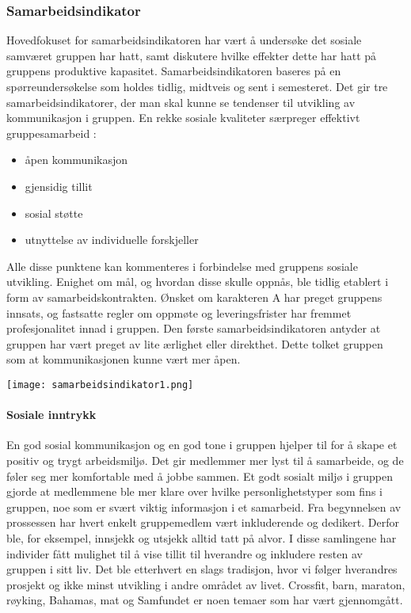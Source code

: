 \subsubsection{Samarbeidsindikator}

Hovedfokuset for samarbeidsindikatoren har vært å undersøke det sosiale samværet gruppen har hatt, samt diskutere hvilke effekter dette har hatt på gruppens produktive kapasitet.
Samarbeidsindikatoren baseres på en spørreundersøkelse som holdes tidlig, midtveis og sent i semesteret.
Det gir tre samarbeidsindikatorer, der man skal kunne se tendenser til utvikling av kommunikasjon i gruppen.
En rekke sosiale kvaliteter særpreger effektivt gruppesamarbeid \cite{orgorg}:

\begin{itemize}
	\item åpen kommunikasjon
	\item gjensidig tillit
	\item sosial støtte
	\item utnyttelse av individuelle forskjeller
\end{itemize}
	
Alle disse punktene kan kommenteres i forbindelse med gruppens sosiale utvikling.
Enighet om mål, og hvordan disse skulle oppnås, ble tidlig etablert i form av samarbeidskontrakten.
Ønsket om karakteren A har preget gruppens innsats, og fastsatte regler om oppmøte og leveringsfrister har fremmet profesjonalitet innad i gruppen.
Den første samarbeidsindikatoren antyder at gruppen har vært preget av lite ærlighet eller direkthet.
Dette tolket gruppen som at kommunikasjonen kunne vært mer åpen.

\begin{center}
	\texttt{[image: samarbeidsindikator1.png]}
\end{center}

\paragraph{Sosiale inntrykk}

En god sosial kommunikasjon og en god tone i gruppen hjelper til for å skape et positiv og trygt arbeidsmiljø.
Det gir medlemmer mer lyst til å samarbeide, og de føler seg mer komfortable med å jobbe sammen.
Et godt sosialt miljø i gruppen gjorde at medlemmene ble mer klare over hvilke personlighetstyper som fins i gruppen, noe som er svært viktig informasjon i et samarbeid.
Fra begynnelsen av prossessen har hvert enkelt gruppemedlem vært inkluderende og dedikert. 
Derfor ble, for eksempel, innsjekk og utsjekk alltid tatt på alvor.
I disse samlingene har individer fått mulighet til å vise tillit til hverandre og inkludere resten av gruppen i sitt liv. 
Det ble etterhvert en slags tradisjon, hvor vi følger hverandres prosjekt og ikke minst utvikling i andre området av livet.
Crossfit, barn, maraton, røyking, Bahamas, mat og Samfundet er noen temaer som har vært gjennomgått.

